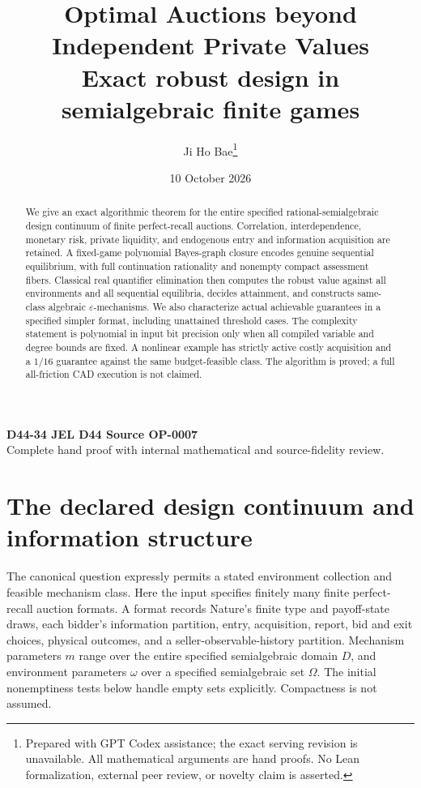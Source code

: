 \documentclass[11pt,a4paper]{article}
\title{Optimal Auctions beyond Independent Private Values\\[4pt]
 \large Exact robust design in semialgebraic finite games}
\author{Ji Ho Bae\thanks{Prepared with GPT Codex assistance; the exact serving revision is unavailable. All mathematical arguments are hand proofs. No Lean formalization, external peer review, or novelty claim is asserted.}}
\date{10 October 2026}
\numberwithin{equation}{section}
\theoremstyle{definition}
\begin{document}
\maketitle
\begin{center}
\small\textbf{D44-34 \quad JEL D44 \quad Source OP-0007}\\
Complete hand proof with internal mathematical and source-fidelity review.
\end{center}
\begin{abstract}
We give an exact algorithmic theorem for the entire specified
rational-semialgebraic design continuum of finite perfect-recall auctions.
Correlation, interdependence, monetary risk, private liquidity, and
endogenous entry and information acquisition are retained.
A fixed-game polynomial Bayes-graph closure encodes genuine sequential
equilibrium, with full continuation rationality and nonempty compact
assessment fibers. Classical real quantifier elimination then computes
the robust value against all environments and all sequential equilibria,
decides attainment, and constructs same-class algebraic
\(\varepsilon\)-mechanisms. We also characterize actual achievable
guarantees in a specified simpler format, including unattained threshold
cases. The complexity statement is polynomial in input bit precision
only when all compiled variable and degree bounds are fixed.
A nonlinear example has strictly active costly acquisition and a
\(1/16\) guarantee against the same budget-feasible class.
The algorithm is proved; a full all-friction CAD execution is not claimed.
\end{abstract}

\section{The declared design continuum and information structure}\label{sec:model}
The canonical question expressly permits a stated environment collection
and feasible mechanism class. Here the input specifies finitely many
finite perfect-recall auction formats. A format records Nature's finite
type and payoff-state draws, each bidder's information partition,
entry, acquisition, report, bid and exit choices, physical outcomes,
and a seller-observable-history partition.
Mechanism parameters \(m\) range over the entire specified
semialgebraic domain \(D\), and environment parameters \(\omega\) over
a specified semialgebraic set \(\Omega\).
The initial nonemptiness tests below handle empty sets explicitly.
Compactness is not assumed.
\end{document}
